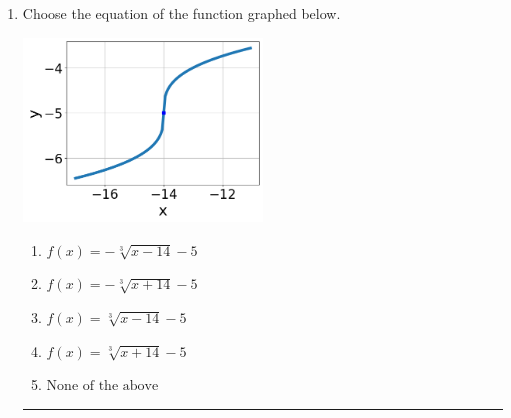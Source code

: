 \documentclass[14pt]{extbook}
\newcommand{\litem}[1]{\item#1\hspace*{-1cm}\rule{\textwidth}{0.4pt}}
\begin{document}
\begin{enumerate}
{\begin{enumerate}[label=\Alph*.]
\end{enumerate} }
\litem{
Choose the equation of the function graphed below.
\begin{center}
    \includegraphics[width=0.5\textwidth]{../Figures/radicalGraphToEquationC.png}
\end{center}
\begin{enumerate}[label=\Alph*.]
\item \( f(x) = - \sqrt[3]{x - 14} - 5 \)
\item \( f(x) = - \sqrt[3]{x + 14} - 5 \)
\item \( f(x) = \sqrt[3]{x - 14} - 5 \)
\item \( f(x) = \sqrt[3]{x + 14} - 5 \)
\item \( \text{None of the above} \)


\end{enumerate}}
\end{enumerate}
\end{document}
